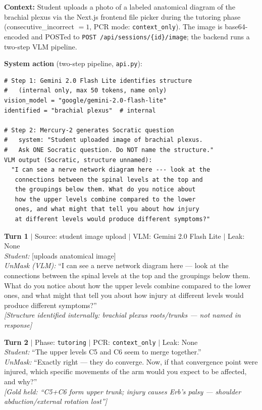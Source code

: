 \documentclass[11pt]{article}
\begin{document}
\noindent\textbf{Context:} Student uploads a photo of a labeled anatomical diagram
of the brachial plexus via the Next.js frontend file picker during the tutoring
phase (consecutive\_incorrect $= 1$, PCR mode: \texttt{context\_only}).
The image is base64-encoded and POSTed to
\texttt{POST /api/sessions/\{id\}/image}; the backend runs a two-step VLM pipeline.

\noindent\textbf{System action} (two-step pipeline, \texttt{api.py}):
\begin{lstlisting}
# Step 1: Gemini 2.0 Flash Lite identifies structure
#   (internal only, max 50 tokens, name only)
vision_model = "google/gemini-2.0-flash-lite"
identified = "brachial plexus"  # internal

# Step 2: Mercury-2 generates Socratic question
#   system: "Student uploaded image of brachial plexus.
#   Ask ONE Socratic question. Do NOT name the structure."
VLM output (Socratic, structure unnamed):
  "I can see a nerve network diagram here --- look at the
   connections between the spinal levels at the top and
   the groupings below them. What do you notice about
   how the upper levels combine compared to the lower
   ones, and what might that tell you about how injury
   at different levels would produce different symptoms?"
\end{lstlisting}

\noindent\textbf{Turn 1} $|$ Source: student image upload $|$ VLM: Gemini 2.0 Flash Lite $|$ Leak: None\\
\textit{Student:} [uploads anatomical image]\\
\textit{UnMask (VLM):} ``I can see a nerve network diagram here --- look at the connections between the spinal levels at the top and the groupings below them. What do you notice about how the upper levels combine compared to the lower ones, and what might that tell you about how injury at different levels would produce different symptoms?''\\
{\small\textit{[Structure identified internally: brachial plexus roots/trunks --- not named in response]}}

\noindent\textbf{Turn 2} $|$ Phase: \texttt{tutoring} $|$ PCR: \texttt{context\_only} $|$ Leak: None\\
\textit{Student:} ``The upper levels C5 and C6 seem to merge together.''\\
\textit{UnMask:} ``Exactly right --- they do converge. Now, if that convergence point were injured, which specific movements of the arm would you expect to be affected, and why?''\\
{\small\textit{[Gold held: ``C5+C6 form upper trunk; injury causes Erb's palsy --- shoulder abduction/external rotation lost'']}}
\end{document}

